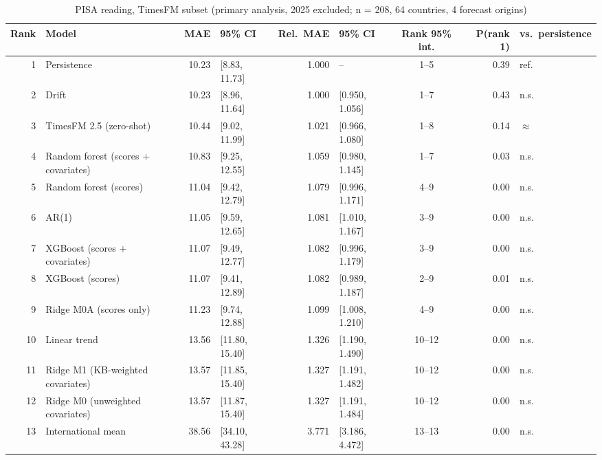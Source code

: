 \begin{table}[htbp]
\centering
\footnotesize
\caption{PISA reading, TimesFM subset (primary analysis, 2025 excluded; n = 208, 64 countries, 4 forecast origins)}
\label{tab:A11}
\begin{tabular}{rlrlrlcrl}
\toprule
Rank & Model & MAE & 95\% CI & Rel.\ MAE & 95\% CI & Rank 95\% int. & P(rank 1) & vs.\ persistence \\
\midrule
1 & Persistence & 10.23 & [8.83, 11.73] & 1.000 & -- & 1--5 & 0.39 & ref. \\
2 & Drift & 10.23 & [8.96, 11.64] & 1.000 & [0.950, 1.056] & 1--7 & 0.43 & n.s. \\
3 & TimesFM 2.5 (zero-shot) & 10.44 & [9.02, 11.99] & 1.021 & [0.966, 1.080] & 1--8 & 0.14 & $\approx$ \\
4 & Random forest (scores + covariates) & 10.83 & [9.25, 12.55] & 1.059 & [0.980, 1.145] & 1--7 & 0.03 & n.s. \\
5 & Random forest (scores) & 11.04 & [9.42, 12.79] & 1.079 & [0.996, 1.171] & 4--9 & 0.00 & n.s. \\
6 & AR(1) & 11.05 & [9.59, 12.65] & 1.081 & [1.010, 1.167] & 3--9 & 0.00 & n.s. \\
7 & XGBoost (scores + covariates) & 11.07 & [9.49, 12.77] & 1.082 & [0.996, 1.179] & 3--9 & 0.00 & n.s. \\
8 & XGBoost (scores) & 11.07 & [9.41, 12.89] & 1.082 & [0.989, 1.187] & 2--9 & 0.01 & n.s. \\
9 & Ridge M0A (scores only) & 11.23 & [9.74, 12.88] & 1.099 & [1.008, 1.210] & 4--9 & 0.00 & n.s. \\
10 & Linear trend & 13.56 & [11.80, 15.40] & 1.326 & [1.190, 1.490] & 10--12 & 0.00 & n.s. \\
11 & Ridge M1 (KB-weighted covariates) & 13.57 & [11.85, 15.40] & 1.327 & [1.191, 1.482] & 10--12 & 0.00 & n.s. \\
12 & Ridge M0 (unweighted covariates) & 13.57 & [11.87, 15.40] & 1.327 & [1.191, 1.484] & 10--12 & 0.00 & n.s. \\
13 & International mean & 38.56 & [34.10, 43.28] & 3.771 & [3.186, 4.472] & 13--13 & 0.00 & n.s. \\
\bottomrule
\end{tabular}
\par{}
\end{table}
